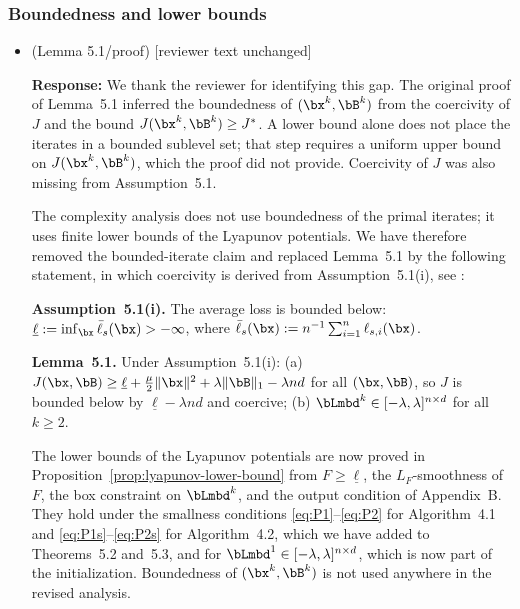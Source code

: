 
\subsubsection{Boundedness and lower bounds}

\begin{itemize}\itshape
\item (Lemma 5.1/proof) [reviewer text unchanged]
\par\smallskip
\normalfont\upshape\textbf{Response:}
We thank the reviewer for identifying this gap. The original proof of Lemma~5.1 inferred the boundedness of $(\bx^k,\bB^k)$ from the coercivity of $J$ and the bound $J(\bx^k,\bB^k)\ge J^*$. A lower bound alone does not place the iterates in a bounded sublevel set; that step requires a uniform upper bound on $J(\bx^k,\bB^k)$, which the proof did not provide. Coercivity of $J$ was also missing from Assumption~5.1.

The complexity analysis does not use boundedness of the primal iterates; it uses finite lower bounds of the Lyapunov potentials. We have therefore removed the bounded-iterate claim and replaced Lemma~5.1 by the following statement, in which coercivity is derived from Assumption~5.1(i), see :
\begin{bluequote}
\textbf{Assumption~5.1(i).} The average loss is bounded below: $\underline{\ell}:=\inf_{\bx}\bar{\ell}_s(\bx)>-\infty$, where $\bar{\ell}_s(\bx):=n^{-1}\sum_{i=1}^n\ell_{s,i}(\bx)$.

\textbf{Lemma~5.1.} Under Assumption~5.1(i): (a) $J(\bx,\bB)\ge\underline{\ell}+\frac{\mu}{2}\|\bx\|^2+\lambda\|\bB\|_1-\lambda nd$ for all $(\bx,\bB)$, so $J$ is bounded below by $\underline{\ell}-\lambda nd$ and coercive; (b) $\bLmbd^k\in[-\lambda,\lambda]^{n\times d}$ for all $k\ge2$.
\end{bluequote}
The lower bounds of the Lyapunov potentials are now proved in Proposition~\ref{prop:lyapunov-lower-bound} from $F\ge\underline{\ell}$, the $L_F$-smoothness of $F$, the box constraint on $\bLmbd^k$, and the output condition of Appendix~B. They hold under the smallness conditions \eqref{eq:P1}--\eqref{eq:P2} for Algorithm~4.1 and \eqref{eq:P1s}--\eqref{eq:P2s} for Algorithm~4.2, which we have added to Theorems~5.2 and~5.3, and for $\bLmbd^1\in[-\lambda,\lambda]^{n\times d}$, which is now part of the initialization. %
Boundedness of $(\bx^k,\bB^k)$ is not used anywhere in the revised analysis.


\end{itemize}
